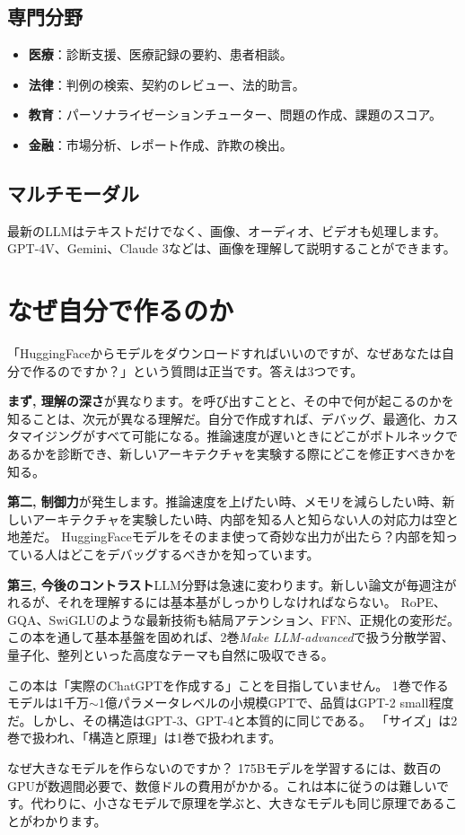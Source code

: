 \subsection{専門分野}
\begin{itemize}
\item\textbf{医療}：診断支援、医療記録の要約、患者相談。
\item\textbf{法律}：判例の検索、契約のレビュー、法的助言。
\item\textbf{教育}：パーソナライゼーションチューター、問題の作成、課題のスコア。
\item\textbf{金融}：市場分析、レポート作成、詐欺の検出。
\end{itemize}

\subsection{マルチモーダル}
最新のLLMはテキストだけでなく、画像、オーディオ、ビデオも処理します。 GPT-4V、Gemini、Claude 3などは、画像を理解して説明することができます。

\section{なぜ自分で作るのか}

「HuggingFaceからモデルをダウンロードすればいいのですが、なぜあなたは自分で作るのですか？」という質問は正当です。答えは3つです。

\textbf{まず, 理解の深さ}が異なります。を呼び出すことと、その中で何が起こるのかを知ることは、次元が異なる理解だ。自分で作成すれば、デバッグ、最適化、カスタマイジングがすべて可能になる。推論速度が遅いときにどこがボトルネックであるかを診断でき、新しいアーキテクチャを実験する際にどこを修正すべきかを知る。

\textbf{第二, 制御力}が発生します。推論速度を上げたい時、メモリを減らしたい時、新しいアーキテクチャを実験したい時、内部を知る人と知らない人の対応力は空と地差だ。 HuggingFaceモデルをそのまま使って奇妙な出力が出たら？内部を知っている人はどこをデバッグするべきかを知っています。

\textbf{第三, 今後のコントラスト}LLM分野は急速に変わります。新しい論文が毎週注がれるが、それを理解するには基本基がしっかりしなければならない。 RoPE、GQA、SwiGLUのような最新技術も結局アテンション、FFN、正規化の変形だ。この本を通して基本基盤を固めれば、2巻\textit{Make LLM-advanced}で扱う分散学習、量子化、整列といった高度なテーマも自然に吸収できる。

\begin{warnbox}[この本の限界]
この本は「実際のChatGPTを作成する」ことを目指していません。 1巻で作るモデルは1千万$\sim$1億パラメータレベルの小規模GPTで、品質はGPT-2 small程度だ。しかし、その構造はGPT-3、GPT-4と本質的に同じである。 「サイズ」は2巻で扱われ、「構造と原理」は1巻で扱われます。

なぜ大きなモデルを作らないのですか？ 175Bモデルを学習するには、数百のGPUが数週間必要で、数億ドルの費用がかかる。これは本に従うのは難しいです。代わりに、小さなモデルで原理を学ぶと、大きなモデルも同じ原理であることがわかります。
\end{warnbox}


